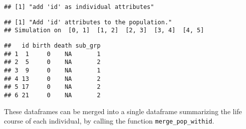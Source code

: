 \begin{verbatim}
## [1] "add 'id' as individual attributes"
\end{verbatim}

\begin{Shaded}
\begin{Highlighting}[]
\NormalTok{(}
                     \NormalTok{(}\NormalTok{=}\NormalTok{),}
                     \NormalTok{(}\NormalTok{,}\NormalTok{, }\NormalTok{), }
                     \NormalTok{)}
\end{Highlighting}
\end{Shaded}

\begin{verbatim}
## [1] "Add 'id' attributes to the population."
## Simulation on  [0, 1]  [1, 2]  [2, 3]  [3, 4]  [4, 5]
\end{verbatim}

\begin{Shaded}
\begin{Highlighting}[]
\OperatorTok{$}\NormalTok{population[[}\NormalTok{]])}
\end{Highlighting}
\end{Shaded}

\begin{verbatim}
##   id birth death sub_grp
## 1  1     0    NA       1
## 2  5     0    NA       2
## 3  9     0    NA       1
## 4 13     0    NA       2
## 5 17     0    NA       2
## 6 21     0    NA       2
\end{verbatim}

These dataframes can be merged into a single dataframe summarizing the life course of each individual, by calling the function \texttt{merge\_pop\_withid}.

\begin{Shaded}
\begin{Highlighting}[]
\StringTok{ }\OperatorTok{$}
\StringTok{ }
\end{Highlighting}
\end{Shaded}

